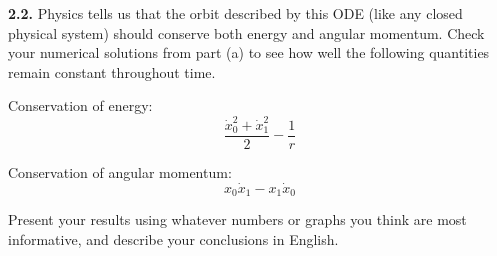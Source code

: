 \documentclass[11pt]{article}
\begin{document}
\par\medskip
{\bf 2.2.}
Physics tells us that the orbit described by this ODE
(like any closed physical system) should conserve both energy and angular momentum.
Check your numerical solutions from part (a) to see how well the following
quantities remain constant throughout time.

\par\medskip
Conservation of energy:
$$\frac{\dot x_0^2 + \dot x_1^2}{2} - \frac{1}{r}$$

Conservation of angular momentum:
$$x_0\dot x_1 - x_1\dot x_0$$

Present your results using whatever numbers or graphs you think
are most informative, and describe your conclusions in English.
\end{document}
